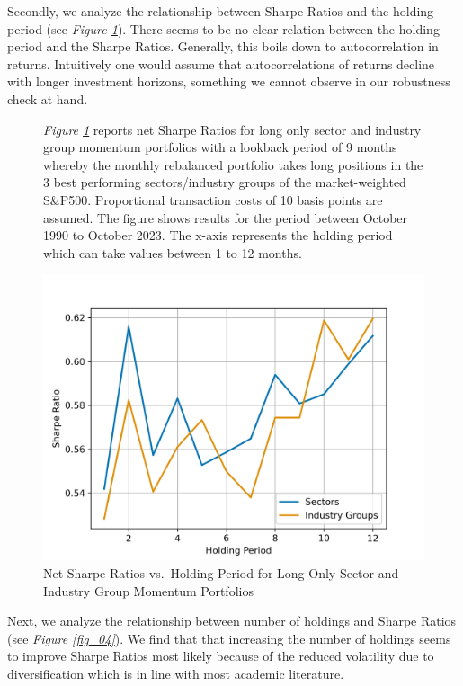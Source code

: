 \documentclass[a4paper,12pt,twoside]{article}
\begin{document}
\newpage
Secondly, we analyze the relationship between Sharpe Ratios and the holding period (see \textit{Figure \ref{fig_05}}). There seems to be no clear relation between the holding period and the Sharpe Ratios. Generally, this boils down to autocorrelation in returns. Intuitively one would assume that autocorrelations of returns decline with longer investment horizons, something we cannot observe in our robustness check at hand.

\begin{figure}[H]
       \captionsetup{justification=centering}
   \caption{Net Sharpe Ratios vs.~Holding Period for Long Only Sector and Industry Group Momentum Portfolios}
    \label{fig_05}
        \textit{Figure \ref{fig_05}} reports net Sharpe Ratios for long only sector and industry group momentum portfolios with a lookback period of 9 months whereby the monthly rebalanced portfolio takes long positions in the 3 best performing sectors/industry groups of the market-weighted S\&P500. Proportional transaction costs of 10 basis points are assumed. The figure shows results for the period between October 1990 to October 2023. The x-axis represents the holding period which can take values between 1 to 12 months.
    \centerline{\includegraphics[width=1\textwidth]{Plots/robustness_check_holdingperiod.png}}
\end{figure}

\newpage
Next, we analyze the relationship between number of holdings and Sharpe Ratios (see \textit{Figure \ref{fig_04}}). We find that that increasing the number of holdings seems to improve Sharpe Ratios most likely because of the reduced volatility due to diversification which is in line with most academic literature.\\
\end{document}
